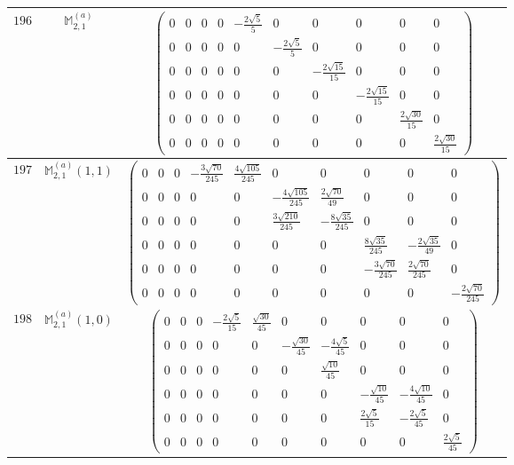 \documentclass[fleqn,8pt,landscape]{jsarticle}
\begin{document}
\begin{center}
\begin{longtable}{ccc}
$ 196 $ & $ \mathbb{M}_{2,1}^{(a)} $ & $ \begin{pmatrix} 0 & 0 & 0 & 0 & - \frac{2 \sqrt{5}}{5} & 0 & 0 & 0 & 0 & 0 \\ 0 & 0 & 0 & 0 & 0 & - \frac{2 \sqrt{5}}{5} & 0 & 0 & 0 & 0 \\ 0 & 0 & 0 & 0 & 0 & 0 & - \frac{2 \sqrt{15}}{15} & 0 & 0 & 0 \\ 0 & 0 & 0 & 0 & 0 & 0 & 0 & - \frac{2 \sqrt{15}}{15} & 0 & 0 \\ 0 & 0 & 0 & 0 & 0 & 0 & 0 & 0 & \frac{2 \sqrt{30}}{15} & 0 \\ 0 & 0 & 0 & 0 & 0 & 0 & 0 & 0 & 0 & \frac{2 \sqrt{30}}{15} \end{pmatrix} $ \\ \hline
$ 197 $ & $ \mathbb{M}_{2,1}^{(a)}(1,1) $ & $ \begin{pmatrix} 0 & 0 & 0 & - \frac{3 \sqrt{70}}{245} & \frac{4 \sqrt{105}}{245} & 0 & 0 & 0 & 0 & 0 \\ 0 & 0 & 0 & 0 & 0 & - \frac{4 \sqrt{105}}{245} & \frac{2 \sqrt{70}}{49} & 0 & 0 & 0 \\ 0 & 0 & 0 & 0 & 0 & \frac{3 \sqrt{210}}{245} & - \frac{8 \sqrt{35}}{245} & 0 & 0 & 0 \\ 0 & 0 & 0 & 0 & 0 & 0 & 0 & \frac{8 \sqrt{35}}{245} & - \frac{2 \sqrt{35}}{49} & 0 \\ 0 & 0 & 0 & 0 & 0 & 0 & 0 & - \frac{3 \sqrt{70}}{245} & \frac{2 \sqrt{70}}{245} & 0 \\ 0 & 0 & 0 & 0 & 0 & 0 & 0 & 0 & 0 & - \frac{2 \sqrt{70}}{245} \end{pmatrix} $ \\ \hline
$ 198 $ & $ \mathbb{M}_{2,1}^{(a)}(1,0) $ & $ \begin{pmatrix} 0 & 0 & 0 & - \frac{2 \sqrt{5}}{15} & \frac{\sqrt{30}}{45} & 0 & 0 & 0 & 0 & 0 \\ 0 & 0 & 0 & 0 & 0 & - \frac{\sqrt{30}}{45} & - \frac{4 \sqrt{5}}{45} & 0 & 0 & 0 \\ 0 & 0 & 0 & 0 & 0 & 0 & \frac{\sqrt{10}}{45} & 0 & 0 & 0 \\ 0 & 0 & 0 & 0 & 0 & 0 & 0 & - \frac{\sqrt{10}}{45} & - \frac{4 \sqrt{10}}{45} & 0 \\ 0 & 0 & 0 & 0 & 0 & 0 & 0 & \frac{2 \sqrt{5}}{15} & - \frac{2 \sqrt{5}}{45} & 0 \\ 0 & 0 & 0 & 0 & 0 & 0 & 0 & 0 & 0 & \frac{2 \sqrt{5}}{45} \end{pmatrix} $ \\ \hline

\end{longtable}
\end{center}
\end{document}
